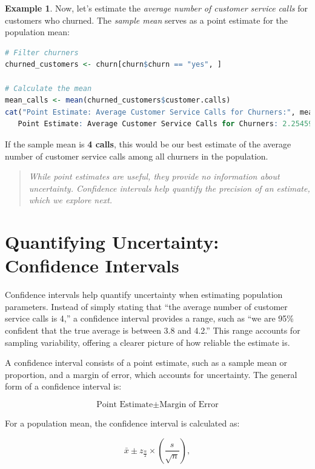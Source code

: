 \documentclass[
  11pt,
]{book}
\theoremstyle{definition}
\theoremstyle{definition}
\newtheorem{example}{Example}[chapter]
\theoremstyle{definition}
\theoremstyle{definition}
\theoremstyle{remark}
\begin{document}
\begin{example}
\protect\hypertarget{exm:ex-est-service-call}{}\label{exm:ex-est-service-call}Now, let's estimate the \emph{average number of customer service calls} for customers who churned. The \emph{sample mean} serves as a point estimate for the population mean:

\begin{lstlisting}[language=R]
# Filter churners
churned_customers <- churn[churn$churn == "yes", ]

# Calculate the mean
mean_calls <- mean(churned_customers$customer.calls)
cat("Point Estimate: Average Customer Service Calls for Churners:", mean_calls)
   Point Estimate: Average Customer Service Calls for Churners: 2.254597
\end{lstlisting}

If the sample mean is \textbf{4 calls}, this would be our best estimate of the average number of customer service calls among all churners in the population.
\end{example}

\begin{quote}
\emph{While point estimates are useful, they provide no information about uncertainty. Confidence intervals help quantify the precision of an estimate, which we explore next.}
\end{quote}

\section{Quantifying Uncertainty: Confidence Intervals}\label{statistics-confidence-interval}

Confidence intervals help quantify uncertainty when estimating population parameters. Instead of simply stating that ``the average number of customer service calls is 4,'' a confidence interval provides a range, such as ``we are 95\% confident that the true average is between 3.8 and 4.2.'' This range accounts for sampling variability, offering a clearer picture of how reliable the estimate is.

A confidence interval consists of a point estimate, such as a sample mean or proportion, and a margin of error, which accounts for uncertainty. The general form of a confidence interval is:

\[
\text{Point Estimate}  \pm \text{Margin of Error}
\]

For a population mean, the confidence interval is calculated as:

\[
\bar{x} \pm z_{\frac{\alpha}{2}} \times \left( \frac{s}{\sqrt{n}} \right),
\]
\end{document}
